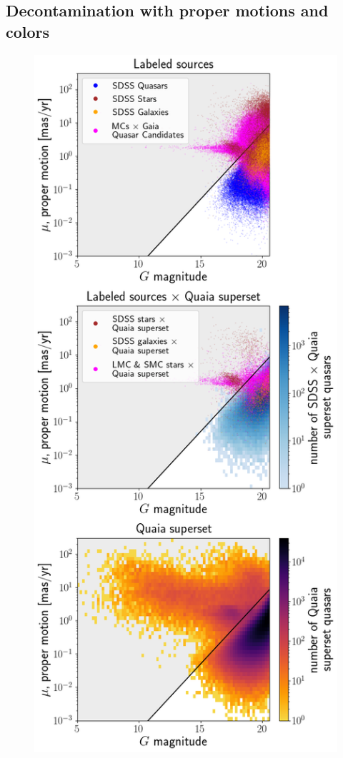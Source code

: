 \subsection{Decontamination with proper motions and \unWISE colors}
\label{sec:decontam}

\begin{figure}
    \centering
    \includegraphics[height=0.75\textheight]{G_pm.png}


\end{figure}
